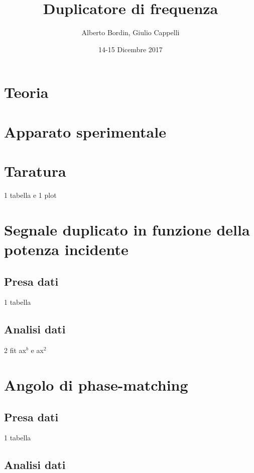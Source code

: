 \documentclass[a4paper]{article}
\author{Alberto Bordin, Giulio Cappelli}
\title{Duplicatore di frequenza}
\date{14-15 Dicembre 2017}
\begin{document}
	\maketitle
	
	\begin{abstract}
		 
	\end{abstract}
	
\section{Teoria}

\section{Apparato sperimentale}

\section{Taratura}

1 tabella e 1 plot

\section{Segnale duplicato in funzione della potenza incidente}

\subsection{Presa dati}

1 tabella

\subsection{Analisi dati}

2 fit ax$^b$ e ax$^2$

\section{Angolo di phase-matching}

\subsection{Presa dati}

1 tabella

\subsection{Analisi dati}
\end{document}
